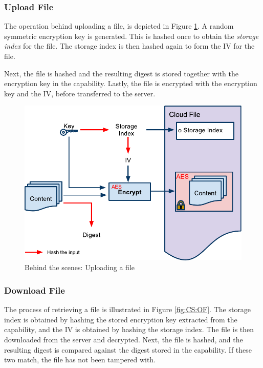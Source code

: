 \documentclass[pdftex,english,10pt,b5paper,twoside]{book}
\begin{document}
\subsubsection{Upload File}
\label{sec:CS:CF}

The operation behind uploading a file, is depicted in Figure \ref{fig:CS:CF}. A
random symmetric encryption key is generated. This is hashed once to obtain the
\emph{storage index} for the file. The storage index is then hashed again to
form the \ac{IV} for the file.

Next, the file is hashed and the resulting digest is stored together with the
encryption key in the capability. Lastly, the file is encrypted with the
encryption key and the \ac{IV}, before transferred to the server.

\begin{figure}[h!]
    \centering
    \includegraphics[width=\columnwidth]{CryptoCreateFile.pdf}
    \caption{Behind the scenes: Uploading a file}
    \label{fig:CS:CF}
\end{figure}

\subsubsection{Download File}
\label{sec:CS:OF}

The process of retrieving a file is illustrated in Figure \ref{fig:CS:OF}. The
storage index is obtained by hashing the stored encryption key extracted from
the capability, and the \ac{IV} is obtained by hashing the storage index. The
file is then downloaded from the server and decrypted. Next, the file is
hashed, and the resulting digest is compared against the digest stored in the
capability. If these two match, the file has not been tampered with.
\end{document}
